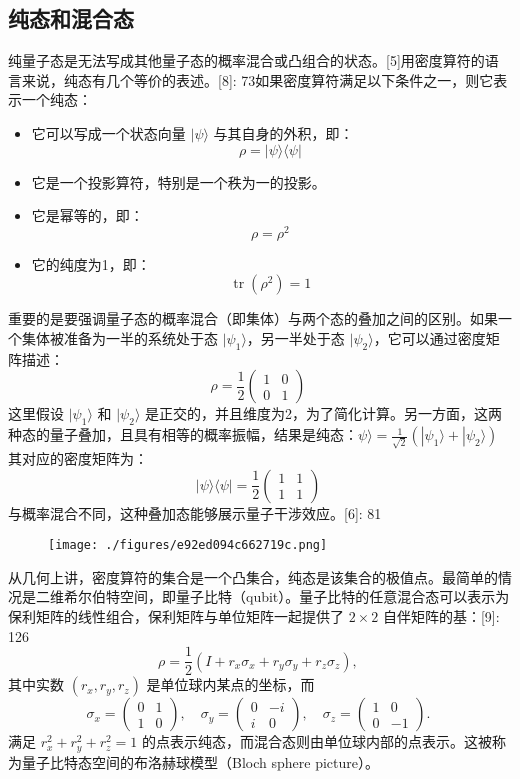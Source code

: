 \subsection{纯态和混合态}
纯量子态是无法写成其他量子态的概率混合或凸组合的状态。[5]用密度算符的语言来说，纯态有几个等价的表述。[8]: 73如果密度算符满足以下条件之一，则它表示一个纯态：
\begin{itemize}
\item 它可以写成一个状态向量 \(|\psi \rangle\) 与其自身的外积，即： 
  \[
  \rho = |\psi \rangle \langle \psi |~
  \]
\item 它是一个投影算符，特别是一个秩为一的投影。
\item 它是幂等的，即：
  \[
  \rho = \rho^2~
  \]
\item 它的纯度为1，即： 
  \[
  \operatorname{tr}(\rho^2) = 1~
  \]
\end{itemize}
重要的是要强调量子态的概率混合（即集体）与两个态的叠加之间的区别。如果一个集体被准备为一半的系统处于态 \(|\psi_1\rangle\)，另一半处于态 \(|\psi_2\rangle\)，它可以通过密度矩阵描述：
\[
\rho = \frac{1}{2} \begin{pmatrix} 1 & 0 \\ 0 & 1 \end{pmatrix}~
\]
这里假设 \(|\psi_1\rangle\) 和 \(|\psi_2\rangle\) 是正交的，并且维度为2，为了简化计算。另一方面，这两种态的量子叠加，且具有相等的概率振幅，结果是纯态：\(\psi\rangle = \frac{1}{\sqrt{2}} (|\psi_1\rangle + |\psi_2\rangle)\)
其对应的密度矩阵为：
\[
|\psi \rangle \langle \psi | = \frac{1}{2} \begin{pmatrix} 1 & 1 \\ 1 & 1 \end{pmatrix}~
\]
与概率混合不同，这种叠加态能够展示量子干涉效应。[6]: 81
\begin{figure}[ht]
\centering
\texttt{[image: ./figures/e92ed094c662719c.png]}
\caption{} \label{fig_MDJZ_1}
\end{figure}
从几何上讲，密度算符的集合是一个凸集合，纯态是该集合的极值点。最简单的情况是二维希尔伯特空间，即量子比特（qubit）。量子比特的任意混合态可以表示为保利矩阵的线性组合，保利矩阵与单位矩阵一起提供了 \(2 \times 2\) 自伴矩阵的基：[9]: 126 
\[
\rho = \frac{1}{2} \left(I + r_x \sigma_x + r_y \sigma_y + r_z \sigma_z\right),~
\]
其中实数 \((r_x, r_y, r_z)\) 是单位球内某点的坐标，而
\[
\sigma_x = \begin{pmatrix} 0 & 1 \\ 1 & 0 \end{pmatrix}, \quad \sigma_y = \begin{pmatrix} 0 & -i \\ i & 0 \end{pmatrix}, \quad \sigma_z = \begin{pmatrix} 1 & 0 \\ 0 & -1 \end{pmatrix}.~
\]
满足 \(r_x^2 + r_y^2 + r_z^2 = 1\) 的点表示纯态，而混合态则由单位球内部的点表示。这被称为量子比特态空间的布洛赫球模型（Bloch sphere picture）。